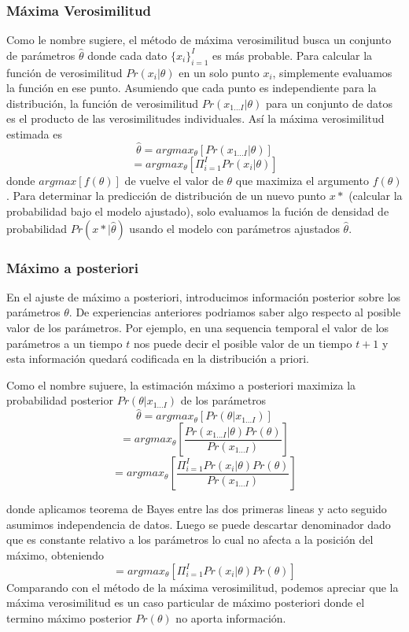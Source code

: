 \documentclass[letter,12pt]{report}
\begin{document}
\subsubsection{Máxima Verosimilitud}
Como le nombre sugiere, el método de máxima verosimilitud busca un conjunto de
parámetros $\hat{\theta}$ donde cada dato $\{x_i\}_{i=1}^I$ es más probable. Para
calcular la función de verosimilitud $Pr(x_i|\theta)$ en un solo punto $x_i$,
simplemente evaluamos la función en ese punto. Asumiendo que cada punto es
independiente para la distribución, la función de verosimilitud
$Pr(x_{1...I}|\theta)$ para un conjunto de datos es el producto de las
verosimilitudes individuales. Así la máxima verosimilitud estimada es 
$$\hat{\theta}=argmax_\theta[Pr(x_{1...I}|\theta)]$$
$$=argmax_\theta[\Pi_{i=1}^IPr(x_i|\theta)]$$ %
donde $argmax[f(\theta)]$ de vuelve el valor de $\theta$ que maximiza el argumento
$f(\theta)$. Para determinar la predicción de distribución de un nuevo punto $x*$
(calcular la probabilidad bajo el modelo ajustado), solo evaluamos la fución de densidad
de probabilidad $Pr(x*|\hat{\theta})$ usando el modelo con parámetros ajustados
$\hat\theta$.

\subsubsection{Máximo a posteriori}
En el ajuste de máximo a posteriori, introducimos información posterior sobre los
parámetros $\theta$. De experiencias anteriores podriamos saber algo respecto al
posible valor de los parámetros. Por ejemplo, en una sequencia temporal el valor de los
parámetros a un tiempo $t$ nos puede decir el posible valor de un tiempo $t+1$ y esta
información quedará codificada en la distribución a priori.

Como el nombre sujuere, la estimación máximo a posteriori maximiza la probabilidad
posterior $Pr(\theta|x_{1...I})$ de los parámetros
$$\hat\theta=argmax_\theta[Pr(\theta|x_{1...I})]$$
$$=argmax_\theta\left[\frac{Pr(x_{1...I}|\theta)Pr(\theta)}{Pr(x_{1...I})}\right]$$
$$=argmax_\theta\left[\frac{\Pi_{i=1}^IPr(x_i|\theta)Pr(\theta)}{Pr(x_{1...I})}\right]$$

donde aplicamos teorema de Bayes entre las dos primeras lineas y acto seguido asumimos
independencia de datos. Luego se puede descartar denominador dado que es constante
relativo a los parámetros lo cual no afecta a la posición del máximo, obteniendo
$$=argmax_\theta\left[\Pi_{i=1}^IPr(x_i|\theta)Pr(\theta)\right]$$
Comparando con el método de la máxima verosimilitud, podemos apreciar que la máxima
verosimilitud es un caso particular de máximo posteriori donde el termino máximo
posterior $Pr(\theta)$ no aporta información.
\end{document}
